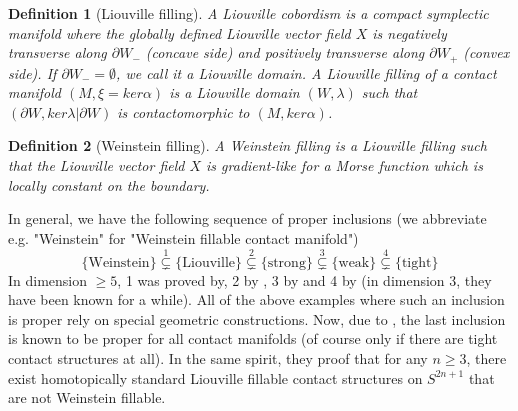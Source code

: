 \documentclass{amsart}
\newtheorem{definition}{Definition}
\begin{document}
\begin{definition}[Liouville filling]
    A Liouville cobordism is a compact symplectic manifold where the globally defined Liouville vector field $X$ is negatively transverse  along $\partial W_-$ (concave side) and positively transverse along $\partial W_+$ (convex side).
    If $\partial W_- = \emptyset$, we call it a Liouville domain.
    A Liouville filling of a contact manifold $(M, \xi = ker \alpha)$ is a Liouville domain $(W, \lambda)$ such that $(\partial W, ker \lambda|\partial W)$ is contactomorphic to $(M, ker \alpha)$.
\end{definition}

\begin{definition}[Weinstein filling]
    A Weinstein filling is a Liouville filling such that the Liouville vector field $X$ is gradient-like for a Morse function which is locally constant on the boundary.
\end{definition}

In general, we have the following sequence of proper inclusions (we abbreviate e.g. "Weinstein" for "Weinstein fillable contact manifold")
\[
      \{\text{Weinstein}\} \overset{1}{\subsetneq} \{\text{Liouville}\} \overset{2}{\subsetneq} \{\text{strong}\} \overset{3}{\subsetneq} \{\text{weak}\} \overset{4}{\subsetneq} \{\text{tight}\}
\]
In dimension $\ge 5$, 1 was proved by\cite[Theorem 1.5]{BCS14}, 2 by \cite{Zhou21}, 3 by \cite{BGM22} and 4 by \cite{MNW13} (in dimension 3, they have been known for a while).
All of the above examples where such an inclusion is proper rely on special geometric
constructions. 
Now, due to \cite{BGMZ22}, the last inclusion is known to be proper for all contact manifolds (of course only if there are tight contact structures at all).
In the same spirit, they proof that for any $n \geq 3$, there exist homotopically standard 
Liouville fillable contact structures on $S^{2n+1}$ that are not Weinstein fillable.
\end{document}
